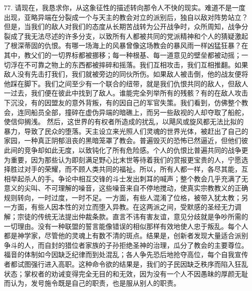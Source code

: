 77. 请现在，我恳求你，从这象征性的描述转向那令人不快的现实。难道不是一度出现，亚略异端在分裂成一个与天主的教会对立的派别后，独自以敌对阵势站立？但是，当我们的敌人对我们的态度从长期苦战转为公开战争时，众所周知，战争分裂成了我无法尽述的许多分支，以致所有人都被共同的党派精神和个人的猜疑激起了根深蒂固的仇恨。有哪一场海上的风暴曾像这场教会的暴风雨一样凶猛狂暴？在其中，教父们的一切界标都被挪移；每一种根基、每一道意见的壁垒都被动摇；一切浮在不可靠之物上的东西都被摔碎和摇落。我们互相攻击，我们互相推翻。如果敌人没有先击打我们，我们就被旁边的同伙所伤。如果敌人被击倒，他的战友便将他踩在脚下。我们之间至少有一个联合的纽带，就是我们仇恨共同的敌人，但敌人一过去，我们便在彼此中找到了敌人。谁能完全列举所有的残骸？有的在敌人攻击下沉没，有的因盟友的意外背叛，有的因自己的军官失策。我们看到，仿佛整个教会，连同船员全部，撞碎在虚伪异端的暗礁上，而另一些敌视的人却夺取了船舵，使信仰搁浅。 然后，这世界的有权者所造成的扰乱，以飓风或旋风都无法比拟的暴力，导致了民众的堕落。天主设立来光照人们灵魂的世界光体，被赶出了自己的家园，一种真正阴郁沮丧的黑暗笼罩了教会。普遍毁灭的恐怖已然逼近，但他们彼此间的竞争却如此无度，以致钝化了所有危险感。个人的仇恨比普遍共同的战争更为重要，因为那些认为即刻满足野心比末世等待着我们的赏报更宝贵的人，宁愿选择胜过对手的荣耀，而不顾人类共同的福祉。所以，所有人都一样，各尽其能，互相举起杀人的手。争论中相互交锋的斗士发出刺耳的喊声；整个教会几乎充满了无意义的尖叫、不可理解的噪音，这些噪音来自不停地搅动，使真实宗教教义的正确规则转向，一时过度，一时不足。一方面，有些人混淆了位格，被带入犹太教；另一方面，有些人因本性的对立而堕入异教。在这两派之间，受默感的圣经无力调解；宗徒的传统无法提出仲裁条款。直言不讳有害友谊，意见分歧就是争吵所需的一切理由。没有一种联盟的誓言能像错误的相似那样有效地使人忠于叛乱。每个人都是神学家，尽管他的灵魂上有数不清的斑点。结果是，创新者发现大量适合派别争斗的人，而自封的猎位者家族的子孙拒绝圣神的治理，瓜分了教会的主要尊位。福音的体制如今因缺乏纪律而到处混乱；各人争先恐后地抢夺高位，每个自我宣传者都试图强行进入高职。这种命令欲的结果是，我们的子民因缺乏秩序而陷入狂乱状态；掌权者的劝诫变得完全无目的和无效，因为没有一个人不因愚昧的厚颜无耻而认为，发号施令既是自己的职责，也是服从别人的职责。\par

